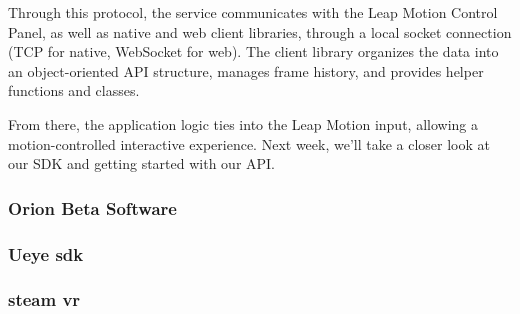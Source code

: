 Through this protocol, the service communicates with the Leap Motion Control Panel, as well as native and web client libraries, through a local socket connection (TCP for native, WebSocket for web). The client library organizes the data into an object-oriented API structure, manages frame history, and provides helper functions and classes.

From there, the application logic ties into the Leap Motion input, allowing a motion-controlled interactive experience. Next week, we’ll take a closer look at our SDK and getting started with our API. \cite{website:LeapMotionBlog}

\subsubsection{Orion Beta Software} \label{OBS}

\subsubsection{Ueye sdk}
\subsubsection{steam vr}


\newpage